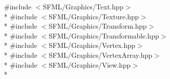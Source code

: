 {\ttfamily \#include $<$S\-F\-M\-L/\-Graphics/\-Text.\-hpp$>$}\\*
{\ttfamily \#include $<$S\-F\-M\-L/\-Graphics/\-Texture.\-hpp$>$}\\*
{\ttfamily \#include $<$S\-F\-M\-L/\-Graphics/\-Transform.\-hpp$>$}\\*
{\ttfamily \#include $<$S\-F\-M\-L/\-Graphics/\-Transformable.\-hpp$>$}\\*
{\ttfamily \#include $<$S\-F\-M\-L/\-Graphics/\-Vertex.\-hpp$>$}\\*
{\ttfamily \#include $<$S\-F\-M\-L/\-Graphics/\-Vertex\-Array.\-hpp$>$}\\*
{\ttfamily \#include $<$S\-F\-M\-L/\-Graphics/\-View.\-hpp$>$}\\*
